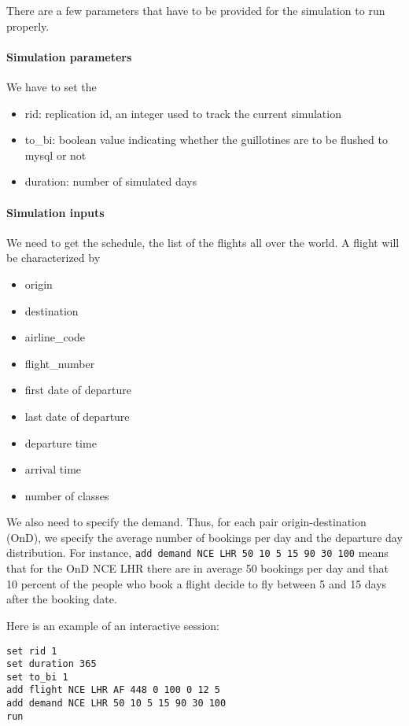 \documentclass[11pt]{JHEP3}
\begin{document}
There are a few parameters that have to be provided for the simulation
to run properly.

\paragraph{Simulation parameters} We have to set the 

\begin{itemize}
\item rid: replication id, an integer used to track the current simulation
\item to\_bi: boolean value indicating whether the guillotines are to
  be flushed to mysql or not
\item duration: number of simulated days
\end{itemize}

\paragraph{Simulation inputs} We need to get the schedule, the list of the flights all over the world. A flight will be characterized by 

\begin{itemize}
\item origin
\item destination
\item airline\_code
\item flight\_number
\item first date of departure
\item last date of departure
\item departure time
\item arrival time
\item number of classes
\end{itemize}

We also need to specify the demand. Thus, for each pair
origin-destination (OnD), we specify the average number of bookings
per day and the departure day distribution. For instance, \texttt{add
  demand NCE LHR 50 10 5 15 90 30 100} means that for the OnD NCE LHR
there are in average 50 bookings per day and that 10 percent of the
people who book a flight decide to fly between 5 and 15 days after the
booking date.

Here is an example of an interactive session:

\begin{verbatim}
set rid 1
set duration 365
set to_bi 1
add flight NCE LHR AF 448 0 100 0 12 5
add demand NCE LHR 50 10 5 15 90 30 100
run
\end{verbatim}
\end{document}
